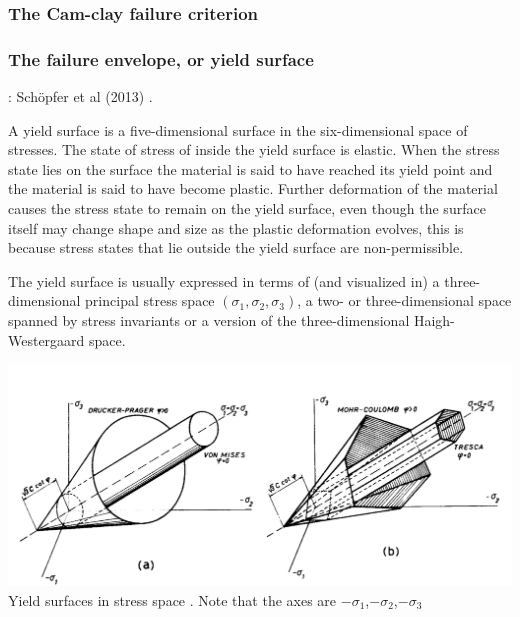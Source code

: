 \subsubsection{The Cam-clay failure criterion}



\subsubsection{The failure envelope, or yield surface}
\label{ss:envelope} 

\Literature: Sch{\"o}pfer et al (2013) \cite{sccm13}.

A yield surface is a five-dimensional surface in the six-dimensional space of stresses. 
The state of stress of inside the yield surface is elastic. 
When the stress state lies on the surface the material is said to have reached its yield point 
and the material is said to have become plastic. Further deformation of the material causes 
the stress state to remain on the yield surface, even though the surface itself may change shape and 
size as the plastic deformation evolves, this is because stress states that lie outside the yield surface are non-permissible.

The yield surface is usually expressed in terms of (and visualized in) a three-dimensional principal stress space $(\sigma_1,\sigma_2,\sigma_3)$, a two- or three-dimensional space spanned by stress invariants 
or a version of the three-dimensional Haigh-Westergaard space. 

\begin{center}
\includegraphics[width=14cm]{images/rheology/surfaces}\\
{\captionfont Yield surfaces in stress space \cite{zico74}. Note that 
the axes are $-\sigma_1$,$-\sigma_2$,$-\sigma_3$}
\end{center} 

